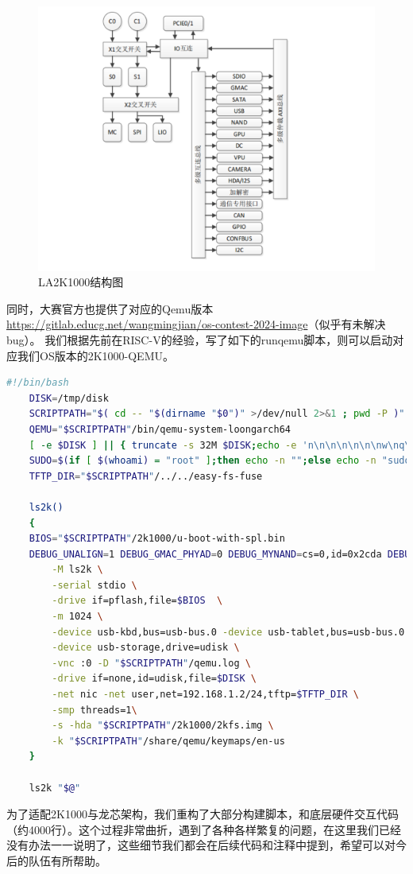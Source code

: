 \begin{figure}[htp]
    \centering
    \label{fig:LA2K1000}
    \includegraphics[width=0.7\linewidth]{figs/1-2.png}
    \caption{LA2K1000结构图}
\end{figure}

同时，大赛官方也提供了对应的Qemu版本\href{https://gitlab.educg.net/wangmingjian/os-contest-2024-image}{https://gitlab.educg.net/wangmingjian/os-contest-2024-image}（似乎有未解决bug）。
我们根据先前在RISC-V的经验，写了如下的runqemu脚本，则可以启动对应我们OS版本的2K1000-QEMU。
\begin{lstlisting}[language={bash},caption={uitl/qemu/runqemu}]
    #!/bin/bash
    DISK=/tmp/disk
    SCRIPTPATH="$( cd -- "$(dirname "$0")" >/dev/null 2>&1 ; pwd -P )"
    QEMU="$SCRIPTPATH"/bin/qemu-system-loongarch64
    [ -e $DISK ] || { truncate -s 32M $DISK;echo -e 'n\n\n\n\n\n\nw\nq\n'| fdisk /tmp/disk; }
    SUDO=$(if [ $(whoami) = "root" ];then echo -n "";else echo -n "sudo";fi)
    TFTP_DIR="$SCRIPTPATH"/../../easy-fs-fuse
    
    ls2k()
    {
    BIOS="$SCRIPTPATH"/2k1000/u-boot-with-spl.bin
    DEBUG_UNALIGN=1 DEBUG_GMAC_PHYAD=0 DEBUG_MYNAND=cs=0,id=0x2cda DEBUG_MYSPIFLASH=gd25q128 $QEMU \
        -M ls2k \
        -serial stdio \
        -drive if=pflash,file=$BIOS  \
        -m 1024 \
        -device usb-kbd,bus=usb-bus.0 -device usb-tablet,bus=usb-bus.0 \
        -device usb-storage,drive=udisk \
        -vnc :0 -D "$SCRIPTPATH"/qemu.log \
        -drive if=none,id=udisk,file=$DISK \
        -net nic -net user,net=192.168.1.2/24,tftp=$TFTP_DIR \
        -smp threads=1\
        -s -hda "$SCRIPTPATH"/2k1000/2kfs.img \
        -k "$SCRIPTPATH"/share/qemu/keymaps/en-us
    }
    
    ls2k "$@"
\end{lstlisting}
为了适配2K1000与龙芯架构，我们重构了大部分构建脚本，和底层硬件交互代码（约4000行）。这个过程非常曲折，遇到了各种各样繁复的问题，在这里我们已经没有办法一一说明了，这些细节我们都会在后续代码和注释中提到，希望可以对今后的队伍有所帮助。